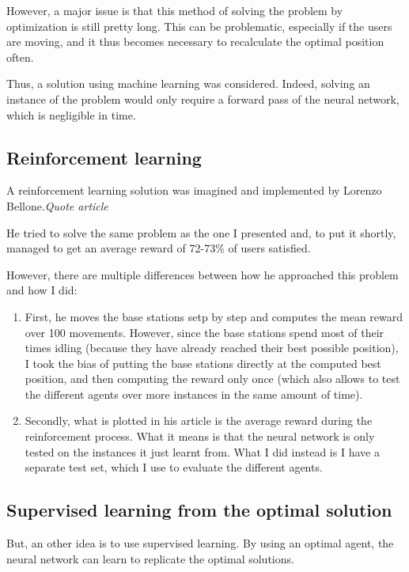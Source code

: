 \documentclass[letterpaper]{article}
\begin{document}
However, a major issue is that this method of solving the problem by optimization is still pretty long.
This can be problematic, especially if the users are moving, and it thus becomes necessary to recalculate the optimal position often.

Thus, a solution using machine learning was considered.
Indeed, solving an instance of the problem would only require a forward pass of the neural network, which is negligible in time.

\subsection{Reinforcement learning}

A reinforcement learning solution was imagined and implemented by Lorenzo Bellone.\textit{Quote article}

He tried to solve the same problem as the one I presented and, to put it shortly, managed to get an average reward of 72-73\% of users satisfied.

However, there are multiple differences between how he approached this problem and how I did:

\begin{enumerate}
    \item First, he moves the base stations setp by step and computes the mean reward over 100 movements.
          However, since the base stations spend most of their times idling (because they have already reached their best possible position),
          I took the bias of putting the base stations directly at the computed best position, and then computing the reward only once (which also allows to test the different agents over more instances in the same amount of time).
    \item Secondly, what is plotted in his article is the average reward during the reinforcement process.
          What it means is that the neural network is only tested on the instances it just learnt from.
          What I did instead is I have a separate test set, which I use to evaluate the different agents.
\end{enumerate}

\subsection{Supervised learning from the optimal solution}

But, an other idea is to use supervised learning.
By using an optimal agent, the neural network can learn to replicate the optimal solutions.
\end{document}
